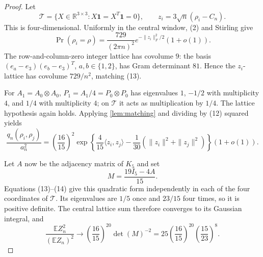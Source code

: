 \documentclass[11pt,a4paper]{article}
\theoremstyle{plain}
\theoremstyle{definition}
\theoremstyle{remark}
\newcommand{\E}{\mathbb E}
\newcommand{\R}{\mathbb R}
\newcommand{\one}{\mathbf 1}
\newcommand{\cT}{\mathcal T}
\begin{document}
\begin{proof}
Let
\[
 \cT=\{X\in\R^{3\times3}:X\one=X^T\one=0\},\qquad
 z_i=3\sqrt n(\rho_i-C_n).
\]
This is four-dimensional.  Uniformly in the central window, (2) and Stirling give
\[
 \Pr(\rho_i=\rho)=\frac{729}{(2\pi n)^2}e^{-\|z_i\|_F^2/2}(1+o(1)). \tag{13}
\]
The row-and-column-zero integer lattice has covolume $9$: the basis
$(e_a-e_3)(e_b-e_3)^T$, $a,b\in\{1,2\}$, has Gram determinant $81$.  Hence the
$z_i$-lattice has covolume $729/n^2$, matching (13).

For $A_1=A_0\otimes A_0$, $P_1=A_1/4=P_0\otimes P_0$ has eigenvalues
$1$, $-1/2$ with multiplicity $4$, and $1/4$ with multiplicity $4$; on $\cT$ it acts
as multiplication by $1/4$.  The lattice hypothesis again holds.  Applying
\cref{lem:matching} and dividing by (12) squared yields
\[
 \frac{q_n(\rho_i,\rho_j)}{a_n^2}
 =\left(\frac{16}{15}\right)^2
 \exp\left\{\frac4{15}\langle z_i,z_j\rangle
 -\frac1{30}(\|z_i\|^2+\|z_j\|^2)\right\}(1+o(1)).             \tag{14}
\]

Let $A$ now be the adjacency matrix of $K_5$ and set
\[
 M=\frac{19I_5-4A}{15}.
\]
Equations (13)--(14) give this quadratic form independently in each of the four
coordinates of $\cT$.  Its eigenvalues are $1/5$ once and $23/15$ four times, so it is
positive definite.  The central lattice sum therefore converges to its Gaussian
integral, and
\[
 \frac{\E Z_n^2}{(\E Z_n)^2}\longrightarrow
 \left(\frac{16}{15}\right)^{20}\det(M)^{-2}
 =25\left(\frac{16}{15}\right)^{20}\left(\frac{15}{23}\right)^8.
\]
\end{proof}
\end{document}

